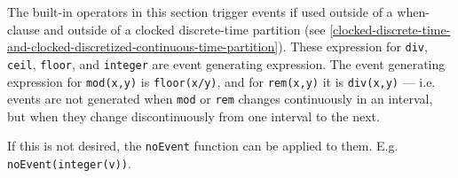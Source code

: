 The built-in operators in this section trigger events if used outside of
a when-clause and outside of a clocked discrete-time partition (see
\autoref{clocked-discrete-time-and-clocked-discretized-continuous-time-partition}).
These expression for \lstinline!div!, \lstinline!ceil!, \lstinline!floor!, and \lstinline!integer! are
event generating expression. The event generating expression for
\lstinline!mod(x,y)! is \lstinline!floor(x/y)!, and for \lstinline!rem(x,y)! it is \lstinline!div(x,y)! --- i.e. events
are not generated when \lstinline!mod! or \lstinline!rem! changes continuously in an interval,
but when they change discontinuously from one interval to the next.

\begin{nonnormative}
If this is not desired, the \lstinline!noEvent! function can be applied to them.  E.g. \lstinline!noEvent(integer(v))!.
\end{nonnormative}

